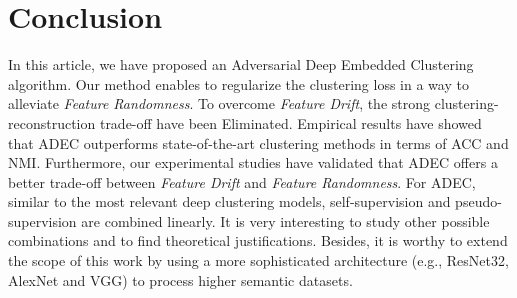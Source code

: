 \documentclass{article}
\begin{document}
\section{Conclusion}
In this article, we have proposed an Adversarial Deep Embedded Clustering algorithm. Our method enables to regularize the clustering loss in a way to alleviate \textit{Feature Randomness}. To overcome \textit{Feature Drift}, the strong clustering-reconstruction trade-off have been Eliminated. Empirical results have showed that ADEC outperforms state-of-the-art clustering methods in terms of ACC and NMI. Furthermore, our experimental studies have validated that ADEC offers a better trade-off between \textit{Feature Drift} and \textit{Feature Randomness}. For ADEC, similar to the most relevant deep clustering models, self-supervision and pseudo-supervision are combined linearly. It is very interesting to study other possible combinations and to find theoretical justifications. Besides, it is worthy to extend the scope of this work by using a more sophisticated architecture (e.g., ResNet32, AlexNet and VGG) to process higher semantic datasets.
\end{document}
